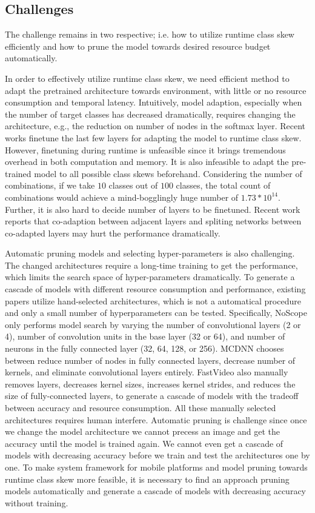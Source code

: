 \documentclass[pageno]{jpaper}
\begin{document}
\subsection{Challenges}
The challenge remains in two respective; i.e. how to utilize runtime class skew efficiently and how to prune the model towards desired resource budget automatically. 

In order to effectively utilize runtime class skew, we need efficient method to adapt the pretrained architecture towards environment, with little or no resource consumption and temporal latency. Intuitively, model adaption, especially when the number of target classes has decreased dramatically, requires changing the architecture, e.g., the reduction on number of nodes in the softmax layer. Recent works finetune the last few layers for adapting the model to runtime class skew. However, finetuning during runtime is unfeasible since it brings tremendous overhead in both computation and memory. It is also infeasible to adapt the pre-trained model to all possible class skews beforehand. Considering the number of combinations, if we take $10$ classes out of $100$ classes, the total count of combinations would achieve a mind-bogglingly huge number of $1.73*10^{14}$. Further, it is also hard to decide number of layers to be finetuned. Recent work \cite{yosinski2014transferable} reports that co-adaption between adjacent layers and spliting networks between co-adapted layers may hurt the performance dramatically. 

Automatic pruning models and selecting hyper-parameters is also challenging. The changed architectures require a long-time training to get the performance, which limits the search space of hyper-parameters dramatically. To generate a cascade of models with different resource consumption and performance, existing papers utilize hand-selected architectures, which is not a automatical procedure and only a small number of hyperparameters can be tested. Specifically, NoScope \cite{kang2017noscope} only performs model search by varying the number of convolutional layers (2 or 4), number of convolution units in the base layer (32 or 64), and number of neurons in the fully connected layer (32, 64, 128, or 256). MCDNN \cite{han2016mcdnn} chooses between reduce number of nodes in fully connected layers, decrease number of kernels, and eliminate convolutional layers entirely. FastVideo \cite{shen2016fast} also manually removes layers, decreases kernel sizes, increases kernel strides, and reduces the size of fully-connected layers, to generate a cascade of models with the tradeoff between accuracy and resource consumption. All these manually selected architectures requires human interfere. Automatic pruning is challenge since once we change the model architecture we cannot precess an image and get the accuracy until the model is trained again. We cannot even get a cascade of models with decreasing accuracy before we train and test the architectures one by one. To make system framework for mobile platforms and model pruning towards runtime class skew more feasible, it is necessary to find an approach pruning models automatically and generate a cascade of models with decreasing accuracy without training.
\end{document}

